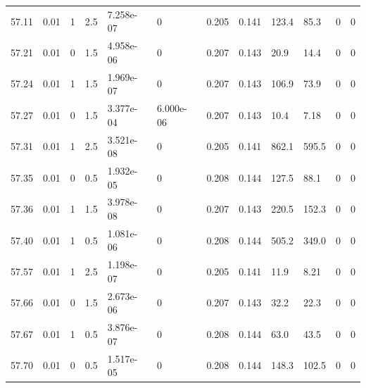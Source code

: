\documentclass[preview]{standalone}
\begin{document}
{{{{{{{{{{{{{{{{{{\begin{tabular}{L{1.2cm}C{1.2cm} C{0.3cm}C{0.5cm} C{1.4cm}C{1.4cm} C{1.4cm}C{1.4cm} C{1.6cm}C{1.6cm} C{1.6cm}C{1.6cm}}
  57.11  &  0.01  & 1     & 2.5 &  7.258e-07  & 0  &  0.205&   0.141& 123.4 & 85.3   &  0 & 0  \\ 
  57.21  &  0.01  & 0     & 1.5 &  4.958e-06  & 0  &  0.207&   0.143& 20.9 & 14.4   &  0 & 0  \\ 
  57.24  &  0.01  & 1     & 1.5 &  1.969e-07  & 0  &  0.207&   0.143& 106.9 & 73.9   &  0 & 0  \\ 
  57.27  &  0.01  & 0     & 1.5 &  3.377e-04  & 6.000e-06  &  0.207&   0.143& 10.4 & 7.18   &  0 & 0  \\ 
  57.31  &  0.01  & 1     & 2.5 &  3.521e-08  & 0  &  0.205&   0.141& 862.1 & 595.5   &  0 & 0  \\ 
  57.35  &  0.01  & 0     & 0.5 &  1.932e-05  & 0  &  0.208&   0.144& 127.5 & 88.1   &  0 & 0  \\ 
  57.36  &  0.01  & 1     & 1.5 &  3.978e-08  & 0  &  0.207&   0.143& 220.5 & 152.3   &  0 & 0  \\ 
  57.40  &  0.01  & 1     & 0.5 &  1.081e-06  & 0  &  0.208&   0.144& 505.2 & 349.0   &  0 & 0  \\ 
  57.57  &  0.01  & 1     & 2.5 &  1.198e-07  & 0  &  0.205&   0.141& 11.9 & 8.21   &  0 & 0  \\ 
  57.66  &  0.01  & 0     & 1.5 &  2.673e-06  & 0  &  0.207&   0.143& 32.2 & 22.3   &  0 & 0  \\ 
  57.67  &  0.01  & 1     & 0.5 &  3.876e-07  & 0  &  0.208&   0.144& 63.0 & 43.5   &  0 & 0  \\ 
  57.70  &  0.01  & 0     & 0.5 &  1.517e-05  & 0  &  0.208&   0.144& 148.3 & 102.5   &  0 & 0  \\ 
\hline 
\end{tabular} 

}}}}}}}}}}}}}}}}}}
\end{document}
